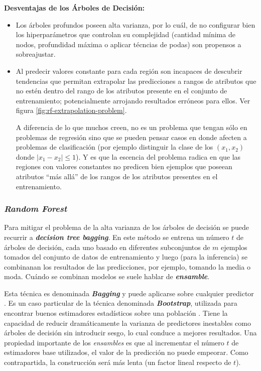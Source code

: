 \textbf{Desventajas de los Árboles de Decisión:}
\begin{itemize}
    \item Los árboles profundos poseen alta varianza, por lo cuál, de no configurar bien los hiperparámetros que controlan su complejidad (cantidad mínima de nodos, profundidad máxima o aplicar técncias de podas) son propensos a sobreajustar.
    \item Al predecir valores constante para cada región son incapaces de descubrir tendencias que permitan extrapolar las predicciones a rangos de atributos que no estén dentro del rango de los atributos presente en el conjunto de entrenamiento; potencialmente arrojando resultados erróneos para ellos. Ver figura \ref{fig:rf-extrapolation-problem}.
    
    A diferencia de lo que muchos creen, no es un problema que tengan sólo en problemas de regresión sino que se pueden pensar casos en donde afecten a problemas de clasificación (por ejemplo distinguir la clase de los $(x_1,x_2)$ donde $|x_1 - x_2 | \leq 1$). Y es que la escencia del problema radica en que las regiones con valores constantes no predicen bien ejemplos que poseean atributos ``más allá'' de los rangos de los atributos presentes en el entrenamiento.
\end{itemize}

\subsubsection{\textit{Random Forest}}

Para mitigar el problema de la alta varianza de los árboles de decisión se puede recurrir a \textit{\textbf{decision tree bagging}}. En este método se entrena un número $t$ de árboles de decisión, cada uno basado en diferentes subconjuntos de $m$ ejemplos tomados del conjunto de datos de entrenamiento y luego (para la inferencia) se combinanan los resultados de las predicciones, por ejemplo, tomando la media o moda. Cuándo se combinan modelos se suele hablar de \textit{\textbf{ensamble}}.

Esta técnica es denominada \textit{\textbf{Bagging}} y puede aplicarse sobre cualquier predictor \cite{breiman-1993}. Es un caso particular de la técnica denominada \textit{\textbf{Bootstrap}}, utilizada para encontrar buenos estimadores estadísticos sobre una población \cite{Hastie}. Tiene la capacidad de reducir dramáticamente la varianza de predictores inestables como árboles de decisión sin introducir sesgo, lo cual conduce a mejores resultados. Una propiedad importante de los \textit{ensambles} es que al incrementar el número $t$ de estimadores base utilizados, el valor de la predicción no puede empeorar. Como  contrapartida, la construcción será más lenta (un factor lineal respecto de $t$). \\

